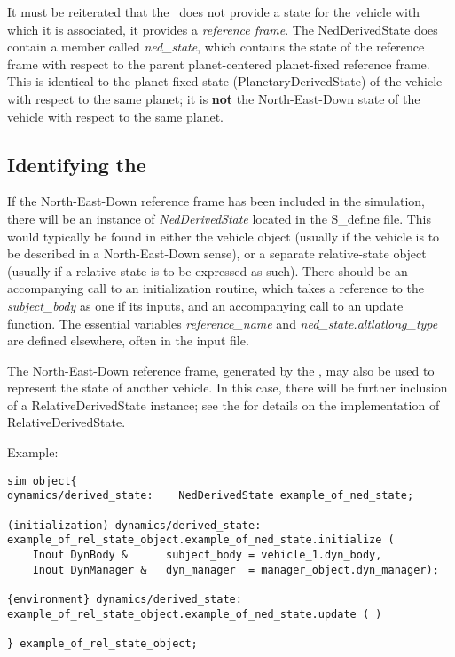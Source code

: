 %
%
% 
%

\label{sec:neduseranalysis}
It must be reiterated that the \NEDDesc\ does not provide a state for the vehicle with which it is associated, it provides a \textit{reference frame}.  The NedDerivedState does contain a member called \textit{ned\_state}, which contains the state of the reference frame with respect to the parent planet-centered planet-fixed reference frame.  This is identical to the planet-fixed state (PlanetaryDerivedState) of the vehicle with respect to the same planet; it is \textbf{not} the North-East-Down state of the vehicle with respect to the same planet. 

\subsection{Identifying the \NEDDesc}
If the North-East-Down reference frame has been included in the simulation, there will be an instance of \textit{NedDerivedState} located in the S\_define file.  This would typically be found in either the vehicle object (usually if the vehicle is to be described in a North-East-Down sense), or a separate relative-state object (usually if a relative state is to be expressed as such).  There should be an accompanying call to an initialization routine, which takes a reference to the \textit{subject\_body} as one if its inputs, and an accompanying call to an update function.  The essential variables \textit{reference\_name} and \textit{ned\_state.altlatlong\_type} are defined elsewhere, often in the input file.

The North-East-Down reference frame, generated by the \NEDDesc, may also be used to represent the state of another vehicle.  In this case, there will be further inclusion of a RelativeDerivedState instance; see the  for details on the implementation of RelativeDerivedState.

Example:
\begin{verbatim}
sim_object{
dynamics/derived_state:    NedDerivedState example_of_ned_state;

(initialization) dynamics/derived_state:
example_of_rel_state_object.example_of_ned_state.initialize (
    Inout DynBody &      subject_body = vehicle_1.dyn_body,
    Inout DynManager &   dyn_manager  = manager_object.dyn_manager);
    
{environment} dynamics/derived_state:
example_of_rel_state_object.example_of_ned_state.update ( )

} example_of_rel_state_object;
\end{verbatim}

